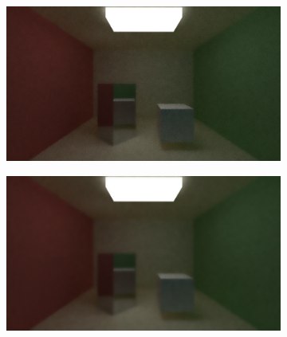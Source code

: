\documentclass[titlepage,12pt]{report}
\begin{document}
\begin{figure}[H]
	\centering
	\begin{subfigure}{.48\textwidth}
		\centering
		\includegraphics[scale=0.2]{media/bilateral/cornell_normal_50_bilateral_filter_21_5_10.png}
		\label{bilateral_filter_13}
	\end{subfigure}
	\begin{subfigure}{.48\textwidth}
		\centering
		\includegraphics[scale=0.2]{media/bilateral/cornell_normal_50_bilateral_filter_21_5_20.png}
		\label{bilateral_filter_14}
	\end{subfigure}


\end{figure}
\end{document}
